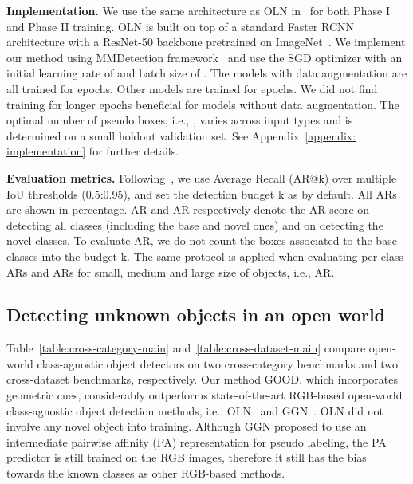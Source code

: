 \documentclass{article} \usepackage{iclr2023_conference,times}
\begin{document}
\textbf{Implementation.}
We use the same architecture as OLN in~\citep{kim_learning_2021} for both Phase I and Phase II training. OLN is built on top of a standard Faster RCNN \citep{ren_faster_2015} architecture with a ResNet-50 backbone pretrained on ImageNet~\citep{imagenet_cvpr09}. We implement our method using MMDetection framework~\citep{mmdetection} and use the SGD optimizer with an initial learning rate of  and batch size of . The models with data augmentation are all trained for  epochs. Other models are trained for  epochs. 
We did not find training for longer epochs beneficial for models without data augmentation.
The optimal number of pseudo boxes, i.e., , varies across input types and is determined on a small holdout validation set.
See Appendix~\ref{appendix: implementation} for further  details. 



\textbf{Evaluation metrics.}
Following~\citep{kim_learning_2021, wang2022open}, we use Average Recall (AR@k) over multiple IoU thresholds (0.5:0.95), and set the detection budget k as  by default. All ARs are shown in percentage. AR and AR respectively denote the AR score on detecting all classes (including the base and novel ones) and on detecting the novel classes. To evaluate AR, we do not count the boxes associated to the base classes into the budget k. The same protocol is applied when evaluating per-class ARs and ARs for small, medium and large size of objects, i.e., AR. 


\subsection{Detecting unknown objects in an open world}
Table~\ref{table:cross-category-main} and~\ref{table:cross-dataset-main} compare open-world class-agnostic object detectors on two cross-category benchmarks and two cross-dataset benchmarks, respectively. Our method GOOD, which incorporates geometric cues, considerably outperforms state-of-the-art RGB-based open-world class-agnostic object detection methods, i.e., OLN~\citep{kim_learning_2021} and GGN~\citep{wang2022open}. OLN did not involve any novel object into training. Although GGN proposed to use an intermediate pairwise affinity (PA) representation for pseudo labeling, the PA predictor is still trained on the RGB images, therefore it still has the bias towards the known classes as other RGB-based methods. 
\end{document}
